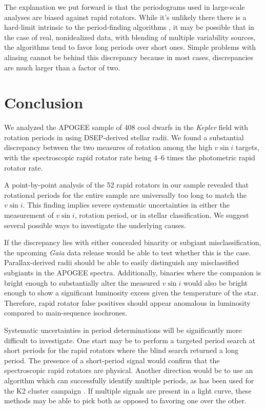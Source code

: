 \documentclass[manuscript]{aastex6}
\newcommand{\vsini}{\ensuremath{v \sin i}}
\newcommand{\Kepler}{\mbox{\textit{Kepler}}}
\newcommand{\Gaia}{\mbox{\textit{Gaia}}}
\begin{document}
The explanation we put forward is that the periodograms used in large-scale
analyses are biased against rapid rotators. While it's unlikely there there is
a hard-limit intrinsic to the period-finding algorithms \citep{Aigrain15}, it
may be possible that in the case of real, nonidealized data, with blending of
multiple variability sources, the algorithms tend to favor long periods over
short ones. Simple problems with aliasing cannot be behind this discrepancy
because in most cases, discrepancies are much larger than a factor of two.

\section{Conclusion}
\label{sec:conclusions}

We analyzed the APOGEE sample of 408 cool dwarfs in the \Kepler{} field with 
rotation periods in \citet{McQuillan14} using DSEP-derived stellar radii. We 
found a substantial discrepancy between the two measures of rotation
among the high \vsini{} targets, with the spectroscopic rapid
rotator rate being 4--6 times the photometric rapid rotator rate. 

A point-by-point analysis of the 52 rapid rotators in our sample revealed that
rotational periods for the entire sample are universally too long to match the 
\vsini{}. This finding implies severe systematic uncertainties in either the
measurement of \vsini{}, rotation period, or in stellar classification. We
suggest several possible ways to investigate the underlying causes.

If the discrepancy lies with either concealed binarity or subgiant
misclassification, the upcoming \Gaia{} data release would be able to
test whether this is the case. Parallax-derived radii should be able to
easily distinguish any misclassified subgiants in the APOGEE spectra.
Additionally, binaries where the companion is bright enough to
substantially alter the measured \vsini{} would also be bright enough to
show a significant luminosity excess given the temperature of the star.
Therefore, rapid rotator false positives should appear anomalous in
luminosity compared to main-sequence isochrones.

Systematic uncertainties in period determinations will be significantly more
difficult to investigate. One start may be to perform a targeted period search
at short periods for the rapid rotators where the blind search returned a long
period. The presence of a short-period signal would confirm that the
spectroscopic rapid rotators are physical. Another direction would be to use an
algorithm which can successfully identify multiple periods, as has been used
for the K2 cluster campaign \citep{Rebull16,Rebull17}. If multiple signals are
present in a light curve, these methods may be able to pick both as opposed to
favoring one over the other.
\end{document}
